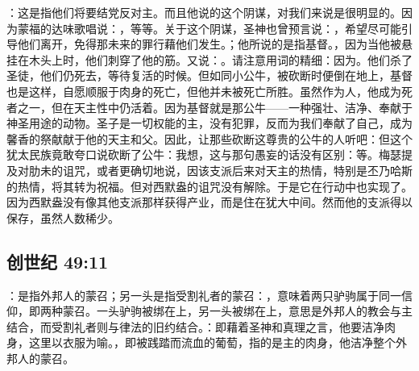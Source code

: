 \par

：这是指他们将要结党反对主。而且他说的这个阴谋，对我们来说是很明显的。因为蒙福的达味歌唱说：，等等。关于这个阴谋，圣神也曾预言说：，希望尽可能引导他们离开，免得那未来的罪行藉他们发生。；他所说的是指基督。，因为当他被悬挂在木头上时，他们刺穿了他的筋。又说：。请注意用词的精细：因为。他们杀了圣徒，他们仍死去，等待复活的时候。但如同小公牛，被砍断时便倒在地上，基督也是这样，自愿顺服于肉身的死亡，但他并未被死亡所胜。虽然作为人，他成为死者之一，但在天主性中仍活着。因为基督就是那公牛——一种强壮、洁净、奉献于神圣用途的动物。圣子是一切权能的主，没有犯罪，反而为我们奉献了自己，成为馨香的祭献献于他的天主和父。因此，让那些砍断这尊贵的公牛的人听吧：但这个犹太民族竟敢夸口说砍断了公牛：我想，这与那句愚妄的话没有区别：等。梅瑟提及对肋未的诅咒，或者更确切地说，因该支派后来对天主的热情，特别是丕乃哈斯的热情，将其转为祝福。但对西默盎的诅咒没有解除。于是它在行动中也实现了。因为西默盎没有像其他支派那样获得产业，而是住在犹大中间。然而他的支派得以保存，虽然人数稀少。\par


\subsection{创世纪 49:11}

\par

：是指外邦人的蒙召；另一头是指受割礼者的蒙召：，意味着两只驴驹属于同一信仰，即两种蒙召。一头驴驹被绑在上，另一头被绑在上，意思是外邦人的教会与主结合，而受割礼者则与律法的旧约结合。：即藉着圣神和真理之言，他要洁净肉身，这里以衣服为喻。，即被践踏而流血的葡萄，指的是主的肉身，他洁净整个外邦人的蒙召。\par

